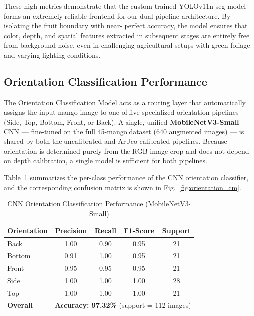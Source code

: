 These high metrics demonstrate that the custom-trained YOLOv11n-seg model forms an extremely
reliable frontend for our dual-pipeline architecture. By isolating the fruit boundary with near-
perfect accuracy, the model ensures that color, depth, and spatial features extracted in
subsequent stages are entirely free from background noise, even in challenging agricultural
setups with green foliage and varying lighting conditions.

\subsection{Orientation Classification Performance}
The Orientation Classification Model acts as a routing layer that automatically assigns the input mango image to one of five specialized orientation pipelines (Side, Top, Bottom, Front, or Back). A single, unified \textbf{MobileNetV3-Small} CNN — fine-tuned on the full 45-mango dataset (640 augmented images) — is shared by both the uncalibrated and ArUco-calibrated pipelines. Because orientation is determined purely from the RGB image crop and does not depend on depth calibration, a single model is sufficient for both pipelines.

Table~\ref{tab:orientation_metrics} summarizes the per-class performance of the CNN orientation classifier, and the corresponding confusion matrix is shown in Fig.~\ref{fig:orientation_cm}.

\begin{table}[htbp]
\caption{CNN Orientation Classification Performance (MobileNetV3-Small)}
\begin{center}
\begin{tabular}{|l|c|c|c|c|}
\hline
\textbf{Orientation} & \textbf{Precision} & \textbf{Recall} & \textbf{F1-Score} & \textbf{Support} \\
\hline
Back   & 1.00 & 0.90 & 0.95 & 21 \\
Bottom & 0.91 & 1.00 & 0.95 & 21 \\
Front  & 0.95 & 0.95 & 0.95 & 21 \\
Side   & 1.00 & 1.00 & 1.00 & 28 \\
Top    & 1.00 & 1.00 & 1.00 & 21 \\
\hline
\textbf{Overall} & \multicolumn{4}{c|}{\textbf{Accuracy: 97.32\%} (support = 112 images)} \\
\hline
\end{tabular}
\label{tab:orientation_metrics}
\end{center}
\end{table}

